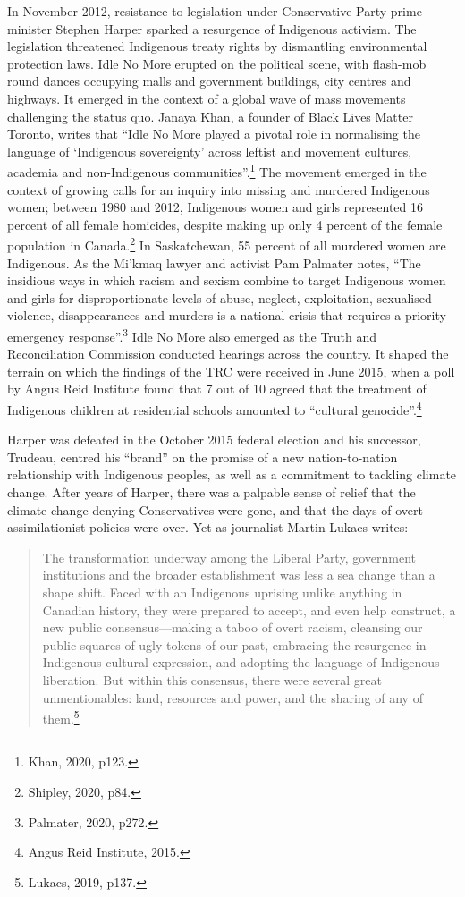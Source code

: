 In November 2012, resistance to legislation under Conservative Party prime minister Stephen Harper sparked a resurgence of Indigenous activism. The legislation threatened Indigenous treaty rights by dismantling environmental protection laws. Idle No More erupted on the political scene, with flash-mob round dances occupying malls and government buildings, city centres and highways. It emerged in the context of a global wave of mass movements challenging the status quo. Janaya Khan, a founder of Black Lives Matter Toronto, writes that ``Idle No More played a pivotal role in normalising the language of `Indigenous sovereignty' across leftist and movement cultures, academia and non-Indigenous communities''.\footnote{Khan, 2020, p123.} The movement emerged in the context of growing calls for an inquiry into missing and murdered Indigenous women; between 1980 and 2012, Indigenous women and girls represented 16 percent of all female homicides, despite making up only 4 percent of the female population in Canada.\footnote{Shipley, 2020, p84.} In Saskatchewan, 55 percent of all murdered women are Indigenous. As the Mi'kmaq lawyer and activist Pam Palmater notes, ``The insidious ways in which racism and sexism combine to target Indigenous women and girls for disproportionate levels of abuse, neglect, exploitation, sexualised violence, disappearances and murders is a national crisis that requires a priority emergency response''.\footnote{Palmater, 2020, p272.} Idle No More also emerged as the Truth and Reconciliation Commission conducted hearings across the country. It shaped the terrain on which the findings of the TRC were received in June 2015, when a poll by Angus Reid Institute found that 7 out of 10 agreed that the treatment of Indigenous children at residential schools amounted to ``cultural genocide''.\footnote{Angus Reid Institute, 2015.}

Harper was defeated in the October 2015 federal election and his successor, Trudeau, centred his ``brand'' on the promise of a new nation-to-nation relationship with Indigenous peoples, as well as a commitment to tackling climate change. After years of Harper, there was a palpable sense of relief that the climate change-denying Conservatives were gone, and that the days of overt assimilationist policies were over. Yet as journalist Martin Lukacs writes:

\blockquote{The transformation underway among the Liberal Party, government institutions and the broader establishment was less a sea change than a shape shift. Faced with an Indigenous uprising unlike anything in Canadian history, they were prepared to accept, and even help construct, a new public consensus---making a taboo of overt racism, cleansing our public squares of ugly tokens of our past, embracing the resurgence in Indigenous cultural expression, and adopting the language of Indigenous liberation. But within this consensus, there were several great unmentionables: land, resources and power, and the sharing of any of them.\footnote{Lukacs, 2019, p137.}}

